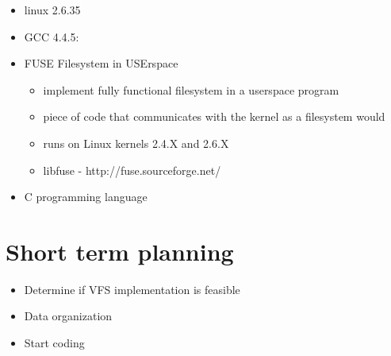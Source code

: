 \documentclass{beamer}
\begin{document}
\begin{frame}
  \begin{itemize}
  \item linux 2.6.35
  \item GCC 4.4.5:
  \item FUSE  Filesystem in USErspace
	\begin{itemize}
	\item implement fully functional filesystem in a userspace program 
	\item piece of code that communicates with the kernel as a filesystem would
	\item runs on Linux kernels 2.4.X and 2.6.X
    \item libfuse - http://fuse.sourceforge.net/
    \end{itemize}
  \item C programming language
  \end{itemize}
\end{frame}

\section{Short term planning}

\begin{frame}
  \begin{itemize}
    \item Determine if VFS implementation is feasible
    \item Data organization
    \item Start coding
  \end{itemize}
\end{frame}
\end{document}
